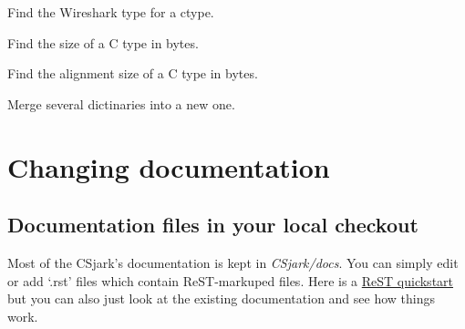 \documentclass[A4paper,10pt,english]{sphinxmanual}
\begin{document}
\begin{fulllineitems}

\begin{fulllineitems}
\label{devel/code:platform.Platform.map_type}
Find the Wireshark type for a ctype.

\end{fulllineitems}


\begin{fulllineitems}
\label{devel/code:platform.Platform.size_of}
Find the size of a C type in bytes.

\end{fulllineitems}


\begin{fulllineitems}
\label{devel/code:platform.Platform.alignment}
Find the alignment size of a C type in bytes.

\end{fulllineitems}


\end{fulllineitems}


\begin{fulllineitems}
\label{devel/code:platform.merge}
Merge several dictinaries into a new one.

\end{fulllineitems}



\section{Changing documentation}
\label{devel/docs:changing-documentation}\label{devel/docs::doc}

\subsection{Documentation files in your local checkout}
\label{devel/docs:documentation-files-in-your-local-checkout}
Most of the CSjark's documentation is kept in \emph{CSjark/docs}.
You can simply edit or add `.rst' files which contain ReST-markuped
files.  Here is a \href{http://docutils.sourceforge.net/docs/user/rst/quickref.html}{ReST quickstart} but you can also just look
at the existing documentation and see how things work.
\end{document}
